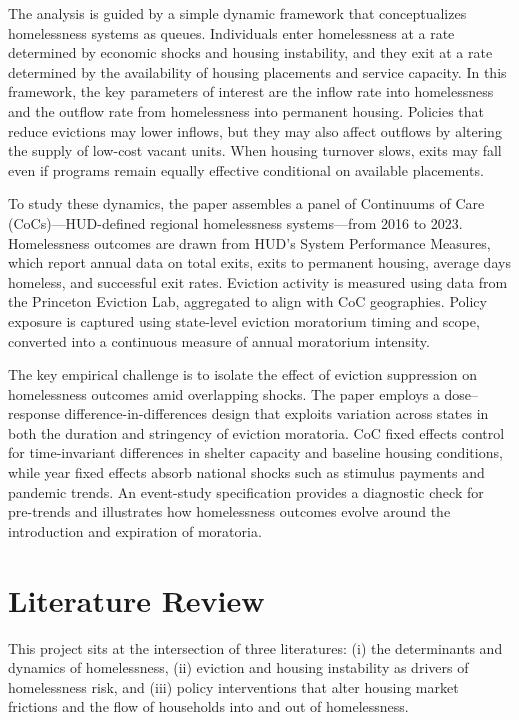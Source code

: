 \documentclass[12pt]{article}
\begin{document}
The analysis is guided by a simple dynamic framework that conceptualizes homelessness systems as queues. Individuals enter homelessness at a rate determined by economic shocks and housing instability, and they exit at a rate determined by the availability of housing placements and service capacity. In this framework, the key parameters of interest are the inflow rate into homelessness and the outflow rate from homelessness into permanent housing. Policies that reduce evictions may lower inflows, but they may also affect outflows by altering the supply of low-cost vacant units. When housing turnover slows, exits may fall even if programs remain equally effective conditional on available placements.

To study these dynamics, the paper assembles a panel of Continuums of Care (CoCs)—HUD-defined regional homelessness systems—from 2016 to 2023. Homelessness outcomes are drawn from HUD’s System Performance Measures, which report annual data on total exits, exits to permanent housing, average days homeless, and successful exit rates. Eviction activity is measured using data from the Princeton Eviction Lab, aggregated to align with CoC geographies. Policy exposure is captured using state-level eviction moratorium timing and scope, converted into a continuous measure of annual moratorium intensity.

The key empirical challenge is to isolate the effect of eviction suppression on homelessness outcomes amid overlapping shocks. The paper employs a dose–response difference-in-differences design that exploits variation across states in both the duration and stringency of eviction moratoria. CoC fixed effects control for time-invariant differences in shelter capacity and baseline housing conditions, while year fixed effects absorb national shocks such as stimulus payments and pandemic trends. An event-study specification provides a diagnostic check for pre-trends and illustrates how homelessness outcomes evolve around the introduction and expiration of moratoria.




\section{Literature Review}
This project sits at the intersection of three literatures: (i) the determinants and dynamics of homelessness, (ii) eviction and housing instability as drivers of homelessness risk, and (iii) policy interventions that alter housing market frictions and the flow of households into and out of homelessness.
\end{document}
